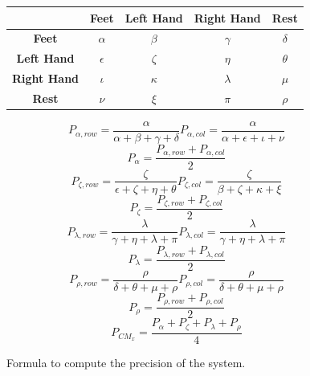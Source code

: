 \begin{figure}[!htbp]
    \centering
    \begin{tabular}{|c||c|c|c|c|}
        \hline
        & \textbf{Feet} & \textbf{Left Hand} & \textbf{Right Hand} & \textbf{Rest} \\
        \hline
        \hline
        \textbf{Feet} & $\alpha$ & $\beta$ & $\gamma$ & $\delta$ \\
        \hline
        \textbf{Left Hand} & $\epsilon$ & $\zeta$ & $\eta$ & $\theta$ \\
        \hline
        \textbf{Right Hand} & $\iota$ & $\kappa$ & $\lambda$ & $\mu$ \\
        \hline
        \textbf{Rest} & $\nu$ & $\xi$ & $\pi$ & $\rho$ \\
        \hline
    \end{tabular}
    \caption{Reference Confision Matrix $CM_x$ for the precision computation.}\label{tab:precision_reference}
    \[
    P_{\alpha,row} = \frac{\alpha}{\alpha + \beta + \gamma + \delta} 
    P_{\alpha,col} = \frac{\alpha}{\alpha + \epsilon + \iota + \nu}
    \]
    \[
    P_{\alpha} = \frac{P_{\alpha,row} + P_{\alpha,col}}{2}
    \]
    \[
    P_{\zeta,row} = \frac{\zeta}{\epsilon + \zeta + \eta + \theta}
    P_{\zeta,col} = \frac{\zeta}{\beta + \zeta + \kappa + \xi}
    \]
    \[
    P_{\zeta} = \frac{P_{\zeta,row} + P_{\zeta,col}}{2}
    \]
    \[
    P_{\lambda,row} = \frac{\lambda}{\gamma + \eta + \lambda + \pi}
    P_{\lambda,col} = \frac{\lambda}{\gamma + \eta + \lambda + \pi}
    \]
    \[
    P_{\lambda} = \frac{P_{\lambda,row} + P_{\lambda,col}}{2}
    \]
    \[
    P_{\rho,row} = \frac{\rho}{\delta + \theta + \mu + \rho}
    P_{\rho,col} = \frac{\rho}{\delta + \theta + \mu + \rho}
    \]
    \[
    P_{\rho} = \frac{P_{\rho,row} + P_{\rho,col}}{2}
    \]
    \[
    P_{CM_x} = \frac{P_{\alpha} + P_{\zeta} + P_{\lambda} + P_{\rho}}{4}
    \]
    \caption{Formula to compute the precision of the system.}\label{fig:precision_formula}
\end{figure}


